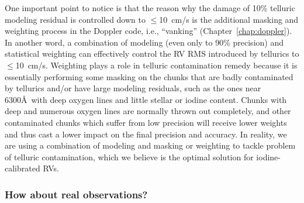 One important point to notice is that the reason why the damage of
10\% telluric modeling residual is controlled down to $\leq$10~cm/s is
the additional masking and weighting process in the Doppler code,
i.e., ``vanking'' (Chapter~\ref{chap:doppler}). In another word, a
combination of modeling (even only to 90\% precision) and statistical
weighting can effectively control the RV RMS introduced by tellurics
to $\leq$10~cm/s. Weighting plays a role in telluric contamination
remedy because it is essentially performing some masking on the
chunks that are badly contaminated by tellurics and/or have large
modeling residuals, such as the ones near 6300\AA\ with deep oxygen
lines and little stellar or iodine content.  Chunks with deep and
numerous oxygen lines are normally thrown out completely, and other
contaminated chunks which suffer from low precision will receive lower
weights and thus cast a lower impact on the final precision and
accuracy. In reality, we are using a combination of modeling and
masking or weighting to tackle problem of telluric contamination,
which we believe is the optimal solution for iodine-calibrated RVs.

\subsubsection{How about real observations?}\label{keck:telluric:real}

